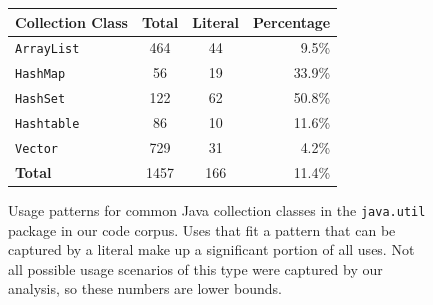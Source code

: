 \documentclass[10pt, conference, compsocconf]{IEEEtran}
\begin{document}
\begin{figure}\label{collections}
\begin{center}
\begin{tabular}{l|c|c|r}
Collection Class& Total & Literal & Percentage \\
\hline
\texttt{ArrayList} & 464	&	44	&	9.5\% \\
\texttt{HashMap}	& 56 & 19 & 33.9\% \\
\texttt{HashSet} & 122 & 62 & 50.8\% \\
\texttt{Hashtable} & 86 & 10 & 11.6\% \\
\texttt{Vector} & 729 & 31 & 4.2\% \\
\hline
\textbf{Total} & 1457 & 166 & 11.4\% \\
\hline
\end{tabular}
\caption{Usage patterns for common Java collection classes in the \texttt{java.util} package in our code corpus. Uses that fit a pattern that can be captured by a literal make up a significant portion of all uses. Not all possible usage scenarios of this type were captured by our analysis, so these numbers are lower bounds.}
\end{center}
\end{figure}

%	

%	


%	
\end{document}
